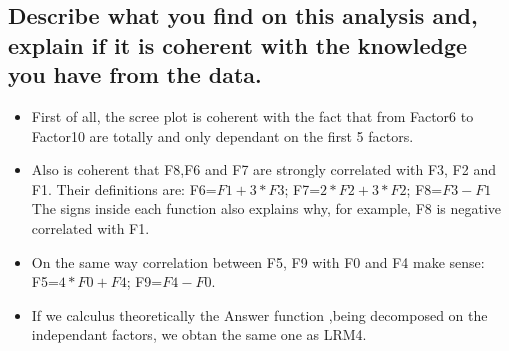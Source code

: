 \documentclass[12pt]{article}
\begin{document}
\subsection {Describe what you find on this analysis and, explain if it is coherent with the knowledge you have from the data.}
\begin{itemize}
\item  First of all, the scree plot is coherent with the fact that from Factor6 to Factor10 are totally and only dependant on the first 5 factors.
\item Also is coherent that F8,F6 and F7 are strongly correlated with F3, F2 and F1. Their definitions are: F6=$F1 + 3*F3$; F7=$2*F2 + 3*F2$; F8=$F3 - F1$
\\The signs inside each function also explains why, for example, F8 is negative correlated with F1.
\item On the same way correlation between F5, F9 with F0 and F4 make sense:
F5=$4*F0 + F4$; F9=$F4 - F0$.
\item If we calculus theoretically the Answer function ,being decomposed on the independant factors, we obtan the same one as LRM4.

\end{itemize}
\newpage
\end{document}
